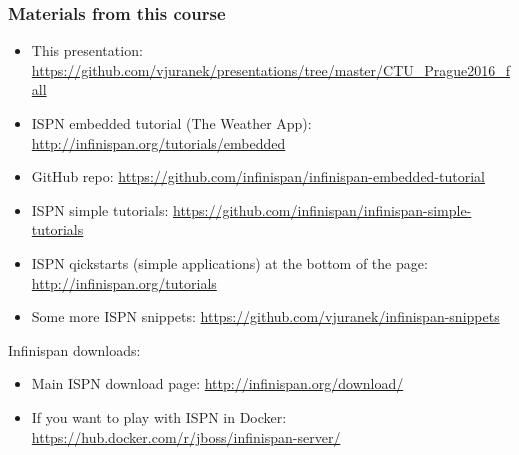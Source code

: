 \documentclass[10pt,utf8]{beamer}
\begin{document}
\begin{frame}
	\frametitle{Materials from this course}
	\scriptsize{
	\begin{itemize}
		\item This presentation: \color{blue}\url{https://github.com/vjuranek/presentations/tree/master/CTU_Prague2016_fall}\color{black}
		\item ISPN embedded tutorial (The Weather App): \color{blue}\url{http://infinispan.org/tutorials/embedded}\color{black}
		\item GitHub repo: \color{blue}\url{https://github.com/infinispan/infinispan-embedded-tutorial}\color{black}
		\item ISPN simple tutorials: \color{blue}\url{https://github.com/infinispan/infinispan-simple-tutorials}\color{black}
		\item ISPN qickstarts (simple applications) at the bottom of the page: \color{blue}\url{http://infinispan.org/tutorials}\color{black}
		\item Some more ISPN snippets: \color{blue}\url{https://github.com/vjuranek/infinispan-snippets}\color{black}
	\end{itemize}
	}
	\vspace{0.5cm}
	Infinispan downloads:
	\scriptsize{
	\begin{itemize}
		\item Main ISPN download page: \color{blue}\url{http://infinispan.org/download/}\color{black}
		\item If you want to play with ISPN in Docker: \color{blue}\url{https://hub.docker.com/r/jboss/infinispan-server/}\color{black}
	\end{itemize}
	}
\end{frame}
\end{document}
